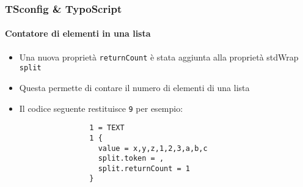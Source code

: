 \begin{frame}[fragile]
	\frametitle{TSconfig \& TypoScript}
	\framesubtitle{Contatore di elementi in una lista}

	\lstset{basicstyle=\tiny\ttfamily}

	\begin{itemize}

		\item Una nuova proprietà \texttt{returnCount} è stata aggiunta alla proprietà stdWrap \texttt{split}

		\item Questa permette di contare il numero di elementi di una lista

		\item Il codice seguente restituisce \texttt{9} per esempio:

			\begin{lstlisting}
				1 = TEXT
				1 {
				  value = x,y,z,1,2,3,a,b,c
				  split.token = ,
				  split.returnCount = 1
				}
			\end{lstlisting}

	\end{itemize}

\end{frame}

